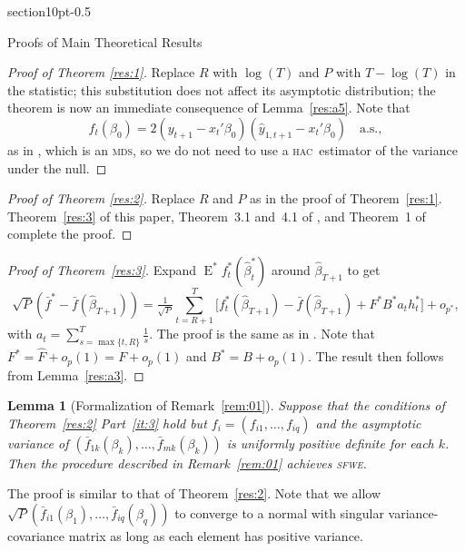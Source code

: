 \documentclass[11pt,fleqn]{article}
\makeatletter
\renewcommand\section{\@startsection%
{section}{1}{0pt}{-\baselineskip}{0.5\baselineskip}%
{\normalfont\normalsize\bfseries\large\raggedright}}
\newtheorem{lem}[thm]{Lemma}
\theoremstyle{definition}
\DeclareMathOperator{\E}{E}
\newcommand{\hac}{\textsc{hac}}
\newcommand{\mds}{\textsc{mds}}
\newcommand{\sfwe}{\textsc{sfwe}}
\makeatother
\begin{document}
\section{Proofs of Main Theoretical Results}\label{sec:B}

\begin{proof}[Proof of Theorem \ref{res:1}]
  Replace $R$ with $\log(T)$ and $P$ with $T - \log(T)$ in the
  statistic; this substitution does not affect its asymptotic
  distribution; the theorem is now an immediate consequence of
  Lemma~\ref{res:a5}.  Note that \[f_t(\beta_0)= 2 (y_{t+1} -
  x_t'\beta_0)(\hat{y}_{1,t+1} - x_t'\beta_0) \quad \text{a.s.},\] as
  in \citet{ClW:07}, which is an \mds, so we do not need to use a
  \hac\ estimator of the variance under the null.
\end{proof}

\begin{proof}[Proof of Theorem \ref{res:2}]
  Replace $R$ and $P$ as in the proof of Theorem~\ref{res:1}.
  Theorem~\ref{res:3} of this paper, Theorem~3.1 and~4.1 of
  \citet{RoW:05}, and Theorem~1 of \citet{Cal:11e} complete the proof.
\end{proof}

\begin{proof}[Proof of Theorem~\ref{res:3}] Expand $\E^{*}
  f_t^{*}(\hat{\beta}_t^{*})$ around $\hat{\beta}_{T+1}$ to get
  \begin{equation}
    \sqrt{P} (\bar{f}^{*} - \bar{f}(\hat{\beta}_{T+1})) =
    \tfrac{1}{\sqrt{P}} \sum_{t=R+1}^T
    \big[f_t^{*}(\hat{\beta}_{T+1}) - \bar{f}(\hat{\beta}_{T+1}) +
    F^{*} B^{*} a_t h_t^{*} \big] + o_{p^{*}},
  \end{equation}
  with $a_t = \sum_{s=\max\{t,R\}}^T \tfrac1s$.  The proof is the same
  as in \citet[Theorem 2.3.1]{Mcc:00}.  Note that $F^{*} = \hat{F} +
  o_{p}(1) = F + o_p(1)$ and $B^{*} = B + o_{p}(1)$.  The result then
  follows from Lemma~\ref{res:a3}.
\end{proof}

\begin{lem}[Formalization of Remark~\ref{rem:01}]
  Suppose that the conditions of Theorem~\ref{res:2} Part~\ref{it:3}
  hold but $f_i = (f_{i1},\dots,f_{iq})$ and the asymptotic variance
  of $(\bar{f}_{1k}(\beta_k),\dots,\bar{f}_{mk}(\beta_k))$ is
  uniformly positive definite for each $k$.  Then the procedure
  described in Remark~\ref{rem:01} achieves \textsl{\sfwe}.
\end{lem}

The proof is similar to that of Theorem~\ref{res:2}. Note that we
allow $\sqrt{P}(\bar{f}_{i1}(\beta_1),\dots,\bar{f}_{iq}(\beta_q))$ to
converge to a normal with singular variance-covariance matrix as long
as each element has positive variance.


\end{document}
